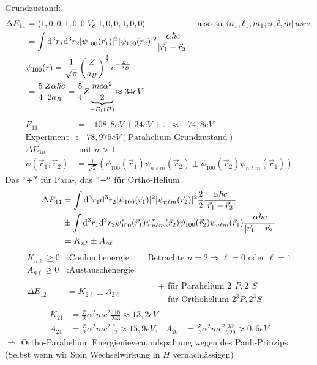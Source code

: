 Grundzustand:
	\begin{align*}
		\Delta E_{11} &=
		\braket{ 1, 0, 0 ; 1, 0, 0| V_e | 1, 0 , 0; 1, 0 ,0 } & 
		&\text{also so:}\bra{n_1, \ell_1, m_1; n , \ell, m} usw.\\
		&= \int \diff^3r_1 \diff^3r_2 |\psi_{100} (\vec{r}_1)|^2 |\psi_{100}(\vec{r}_2)|^2
		\frac{\alpha \hbar c}{|\vec{r}_1 - \vec{r}_2|} \\
		&\psi_{100} (\vec{r}) = \frac{1}{\sqrt{\pi}} 
		\left(\frac{Z}{a_B}\right)^{\frac{3}{2}} e^{-\frac{Zr}{a_B}}\\
		&= \frac{5}{4} \frac{Z \alpha \hbar c}{2 a_B} 
		= \frac{5}{4} Z \underbrace{\frac{mc\alpha^2}{2}}_{\mathclap{-E_1(H)}} 
		\approx 34 eV
	\end{align*}
	\begin{align*}
		E_{11} &= -108,8 eV + 34 eV + \ldots \approx - 74,8 eV \\
		\text{Experiment} &: -78,975eV (\text{Parahelium Grundzustand}) \\
		\Delta E_{1n} &\text{ mit } n>1 \\
		\psi (\vec{r}_1, \vec{r}_2) 
		&= \frac{1}{\sqrt{2}}
		\left( \psi_{100}(\vec{r}_1) \psi_{n \ell m}(\vec{r}_2) 
		\pm \psi_{100}(\vec{r}_2) \psi_{n \ell m} (\vec{r}_1) \right)
	\end{align*}
Das $``+''$ für Para-, das $``-''$ für Ortho-Helium.
	\begin{align*}
		\Delta E_{11} &=
		\int \mathrm{d}^3 r_1 \mathrm{d}^3 r_2 |\psi_{100} (\vec{r}_1)|^2 |\psi_{n \ell m} (\vec{r}_2)|^2
		\frac{2}{2} \frac{\alpha \hbar c}{|\vec{r}_1 - \vec{r}_2|} \\
		&\pm \int \mathrm{d}^3 r_1 \mathrm{d}^3 r_2 \psi_{100}^* (\vec{r}_1) \psi_{n \ell m}^* (\vec{r}_2)
		\psi_{100} (\vec{r}_2) \psi_{n \ell m} (\vec{r}_1)
		\frac{\alpha \hbar c}{|\vec{r}_1 - \vec{r}_2|} \\
		&= K_{n \ell} \pm A_{n \ell}
	\end{align*}
	\begin{align*}
		K_{n \ell} \geq 0 &: \text{Coulombenergie} & 
		&\text{Betrachte } n=2 \Rightarrow \ell = 0 \text{ oder } \ell = 1\\
		A_{n \ell} \geq 0 &: \text{Austauschenergie} \\
		\Delta E_{12} &= K_{2 \ell} \pm A_{2 \ell} &
		&\begin{aligned}
			&+ \text{ für Parahelium } 2^1 P, 2^1 S \\
			&- \text{ für Orthohelium } 2^3 P, 2^3 S
		\end{aligned}
	\end{align*}
	\begin{align*}
		K_{21} &= \frac{Z}{2} \alpha^2 m c^2 \frac{118}{243} \approx 13,2 eV \\
		A_{21} &= \frac{Z}{2} \alpha^2 m c^2 \frac{7}{12} \approx 15,9 eV
		,& A_{20} &= \frac{Z}{2} \alpha^2 m c^2 \frac{32}{729} \approx 0,6 eV
	\end{align*}
$\Rightarrow$ Ortho-Parahelium Energienieveauaufspaltung wegen des Pauli-Prinzips (Selbst wenn wir Spin Wechselwirkung in $H$ vernachlässigen) 

